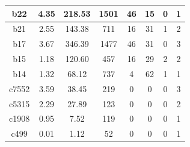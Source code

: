 \documentclass[conference]{IEEEtran}
\begin{document}
\begin{table}[H]
\begin{tabular}{|c|c|c|c|c|c|c|c|}
\hline
b22 & 4.35 & 218.53 & 1501 & 46 & 15 & 0 & 1 \\ 
\hline
b21 & 2.55 & 143.38 & 711 & 16 & 31 & 1 & 2 \\ 
\hline
b17 & 3.67 & 346.39 & 1477 & 46 & 31 & 0 & 3 \\ 
\hline
b15 & 1.18 & 120.60 & 457 & 16 & 29 & 2 & 2 \\ 
\hline
b14 & 1.32 & 68.12 & 737 & 4 & 62 & 1 & 1 \\ 
\hline
c7552 & 3.59 & 38.45 & 219 & 0 & 0 & 0 & 3 \\ 
\hline
c5315 & 2.29 & 27.89 & 123 & 0 & 0 & 0 & 2 \\ 
\hline
c1908 & 0.95 & 7.52 & 119 & 0 & 0 & 0 & 1 \\ 
\hline
c499 & 0.01 & 1.12 & 52 & 0 & 0 & 0 & 1 \\ 
\hline
\end{tabular}
\end{table}
\end{document}
